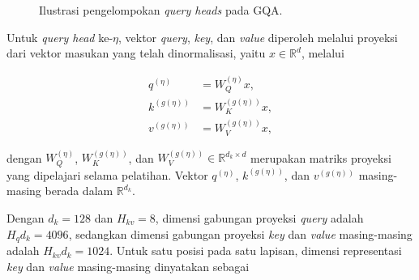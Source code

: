 \begin{figure}[H]
    \centering
    \caption{Ilustrasi pengelompokan \textit{query heads} pada GQA.}
    \label{fig:m-gqa}
\end{figure}

Untuk \textit{query head} ke-$\eta$, vektor \textit{query}, \textit{key}, dan \textit{value} diperoleh melalui proyeksi dari vektor masukan yang telah dinormalisasi, yaitu $x\in\mathbb{R}^{d}$, melalui

\begin{equation}
\begin{aligned}
q^{(\eta)}
&= W_Q^{(\eta)}x,\\
k^{(g(\eta))}
&= W_K^{(g(\eta))}x,\\
v^{(g(\eta))}
&= W_V^{(g(\eta))}x,
\end{aligned}
\label{eq:m-arch-qku}
\end{equation}

dengan $W_Q^{(\eta)}$, $W_K^{(g(\eta))}$, dan $W_V^{(g(\eta))}\in\mathbb{R}^{d_k\times d}$ merupakan matriks proyeksi yang dipelajari selama pelatihan. Vektor $q^{(\eta)}$, $k^{(g(\eta))}$, dan $v^{(g(\eta))}$ masing-masing berada dalam $\mathbb{R}^{d_k}$.

Dengan $d_k=128$ dan $H_{kv}=8$, dimensi gabungan proyeksi \textit{query} adalah $H_qd_k=4096$, sedangkan dimensi gabungan proyeksi \textit{key} dan \textit{value} masing-masing adalah $H_{kv}d_k=1024$. Untuk satu posisi pada satu lapisan, dimensi representasi \textit{key} dan \textit{value} masing-masing dinyatakan sebagai

